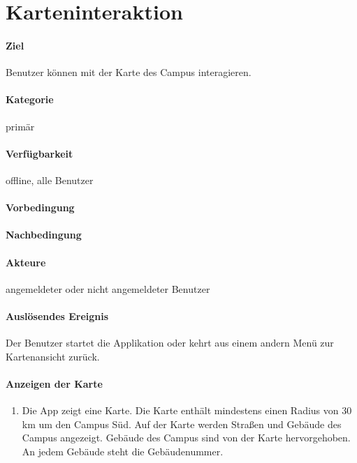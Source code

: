 \section{Karteninteraktion}
\paragraph{Ziel}
Benutzer können mit der Karte des Campus interagieren.
\paragraph{Kategorie}
primär
\paragraph{Verfügbarkeit}
offline, alle Benutzer
\paragraph{Vorbedingung}

\paragraph{Nachbedingung}

\paragraph{Akteure}
angemeldeter oder nicht angemeldeter Benutzer
\paragraph{Auslösendes Ereignis}
Der Benutzer startet die Applikation oder kehrt aus einem andern Menü zur Kartenansicht zurück.
\paragraph{Anzeigen der Karte}
\begin{enumerate}
    \item Die App zeigt eine Karte. Die Karte enthält mindestens einen Radius von 30 km um den Campus Süd. Auf der Karte werden Straßen und Gebäude des Campus angezeigt. Gebäude des Campus sind von der Karte hervorgehoben. An jedem Gebäude steht die Gebäudenummer.
\end{enumerate}
